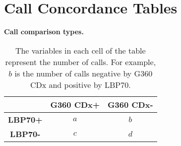 \section{Call Concordance Tables}
\label{a:call_concordance_tables_raw}

 \captionsetup{width=.65\textwidth}
 \begin{table}[H]
 \centering
 \caption{\textbf{Call comparison types.}}
  \label{t:collection12_concordance_types}
 \begin{tabular}{|c|c|c|}
      \hline
       & \textbf{G360 CDx+} & \textbf{G360 CDx-} \\ \hline
      \textbf{LBP70+} & $a$ & $b$ \\ \hline
      \textbf{LBP70-} & $c$ & $d$ \\ \hline
 \end{tabular}
 \caption*{The variables
 in each cell of the table represent the number of calls. For example,
 $b$ is the number of calls negative by G360 CDx and positive by LBP70.}
 \end{table}
 
